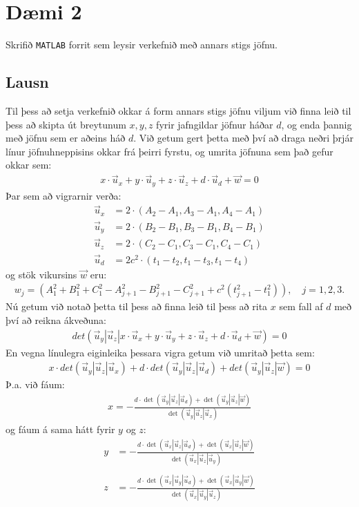 \documentclass[11pt]{article}
\begin{document}
\section*{Dæmi 2}
Skrifið \texttt{MATLAB} forrit sem leysir verkefnið með annars stigs jöfnu. 

\subsection*{Lausn}
Til þess að setja verkefnið okkar á form annars stigs jöfnu viljum við finna leið til þess að skipta út breytunum $x, y, z$ fyrir jafngildar jöfnur háðar $d$, og enda þannig með jöfnu sem er aðeins háð $d$. Við getum gert þetta með því að draga neðri þrjár línur jöfnuhneppisins okkar frá þeirri fyrstu, og umrita jöfnuna sem það gefur okkar sem: 
\begin{align*}
x\cdot\vec{u}_x+y\cdot\vec{u}_y+z\cdot\vec{u}_z+d\cdot\vec{u}_d+\vec{w}=0
\end{align*}
Þar sem að vigrarnir verða:
\begin{align*}
\vec{u}_x&=2\cdot(A_2-A_1,A_3-A_1,A_4-A_1)\\
\vec{u}_y&=2\cdot(B_2-B_1,B_3-B_1,B_4-B_1)\\
\vec{u}_z&=2\cdot(C_2-C_1,C_3-C_1,C_4-C_1)\\
\vec{u}_d&=2c^2\cdot(t_1-t_2,t_1-t_3,t_1-t_4)
\end{align*}
og stök vikursins $\vec{w}$ eru:
\begin{align*}
w_j=(A_1^2+B_1^2+C_1^2-A_{j+1}^2-B_{j+1}^2-C_{j+1}^2+c^2(t_{j+1}^2-t_1^2)),\quad    j=1,2,3.
\end{align*}
Nú getum við notað þetta til þess að finna leið til þess að rita $x$ sem fall af $d$ með því að reikna ákveðuna:
\begin{align*}
det(\vec{u}_y|\vec{u}_z|x\cdot\vec{u}_x+y\cdot\vec{u}_y+z\cdot\vec{u}_z+d\cdot\vec{u}_d+\vec{w})=0
\end{align*}
En vegna línulegra eiginleika þessara vigra getum við umritað þetta sem:
\begin{align*}
x\cdot det(\vec{u}_y|\vec{u}_z|\vec{u}_x)+d\cdot det(\vec{u}_y|\vec{u}_z|\vec{u}_d) +det(\vec{u}_y|\vec{u}_z|\vec{w})=0
\end{align*}
Þ.a. við fáum:
\begin{align*}
x=-\frac{d\cdot \det(\vec{u}_y|\vec{u}_z|\vec{u}_d) +\det(\vec{u}_y|\vec{u}_z|\vec{w})}{\det(\vec{u}_y|\vec{u}_z|\vec{u}_x)}
\end{align*}
og fáum á sama hátt fyrir $y$ og $z$:
\begin{align*}
y&=-\frac{d\cdot \det(\vec{u}_x|\vec{u}_z|\vec{u}_d) +\det(\vec{u}_x|\vec{u}_z|\vec{w})}{\det(\vec{u}_x|\vec{u}_z|\vec{u}_y)}\\
\\
z&=-\frac{d\cdot \det(\vec{u}_x|\vec{u}_y|\vec{u}_d) +\det(\vec{u}_x|\vec{u}_y|\vec{w})}{\det(\vec{u}_x|\vec{u}_y|\vec{u}_z)}
\end{align*}
\end{document}
